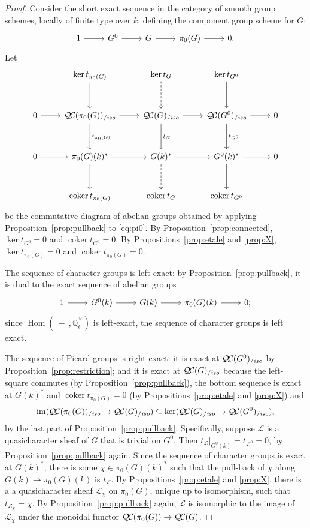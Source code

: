 \documentclass[11pt]{amsart}
\theoremstyle{plain}
\theoremstyle{definition}
\theoremstyle{remark}
\newcommand{\EE}{\mathbb{\bar Q}_\ell}
\newcommand{\Fq}{k}
\newcommand{\EEx}{\EE^\times}
\DeclareMathOperator{\Hom}{Hom}
\DeclareMathOperator{\coker}{coker}
\newcommand{\cs}[1]{{\mathcal{#1}}}
\newcommand{\QC}{{\mathcal{Q\hskip-0.8pt C}}}
\newcommand{\QCiso}[1]{\QC(#1)_{/\textit{iso}}}
\newcommand{\image}{{\operatorname{im}}}
\newcommand{\trFrob}[1]{t_{#1}}
\begin{document}
\begin{proof}
  Consider the short exact sequence in the category of smooth group
  schemes, locally of finite type over $\Fq$, defining the component
  group scheme for $G$:
  \begin{equation}\label{eq:pi0}
  \begin{tikzcd}
    1 \rar & G^0 \rar & G \rar & \pi_0(G) \rar & 0.
  \end{tikzcd}
  \end{equation}
  Let
  \[
  \begin{tikzcd}[row sep=30]
    {}& \ker t_{\pi_0(G)} \dar & \arrow[dashed]{d} \ker \trFrob{G} & \ker t_{G^0} \dar & \\
    0 \rar & \QCiso{\pi_0(G)} \rar \dar{t_{\pi_0(G)}}
    & \QCiso{G} \rar \dar{\trFrob{G}} & \QCiso{G^0} \rar \dar{t_{G^0}} & 0\\
    0 \rar & \pi_0(G)(\Fq)^* \rar \dar
    & \arrow[dashed]{d} G(\Fq)^* \rar & G^0(\Fq)^* \rar \dar & 0\\
    & \coker t_{\pi_0(G)} & \coker \trFrob{G} &  \coker t_{G^0} &
  \end{tikzcd}
  \]
  be the commutative diagram of abelian groups obtained by applying
  Proposition~\ref{prop:pullback} to \eqref{eq:pi0}.  By
  Proposition~\ref{prop:connected}, $\ker t_{G^0} =0$ and $\coker t_{G^0}=0$.
  By Propositions~\ref{prop:etale} and \ref{prop:X}, $\ker t_{\pi_0(G)}=0$
  and $\coker t_{\pi_0(G)}=0$.

  The sequence of character groups is left-exact: by
  Proposition~\ref{prop:pullback}, it is dual to the exact sequence of
  abelian groups
  \begin{equation}\label{eq:pi1}
  \begin{tikzcd}
    1 \rar & G^0(\Fq) \rar & G(\Fq) \rar & \pi_0(G)(\Fq) \rar & 0;
  \end{tikzcd}
  \end{equation}
  since $\Hom(\ - \ ,\EEx)$ is left-exact, the sequence of
  character groups is left exact.

  The sequence of Picard groups is right-exact: it is exact at
  $\QCiso{G^0}$ by Proposition~\ref{prop:restriction}; and
  it is exact at $\QCiso{G}$ because the left-square
  commutes (by Proposition~\ref{prop:pullback}), the bottom sequence
  is exact at $G(\Fq)^*$ and $\coker t_{\pi_0(G)} =0$
  (by Propositions~\ref{prop:etale} and \ref{prop:X}) and
  \[
  \image(\QCiso{\pi_0(G)} \to \QCiso{G}) \subseteq \ker(\QCiso{G} \to \QCiso{G^0}),
  \]
  by the last part of Proposition~\ref{prop:pullback}. Specifically,
  suppose $\cs{L}$ is a quasicharacter sheaf of $G$ that is trivial on
  $G^0$. Then $\trFrob{\cs{L}}\vert_{G^0(\Fq)} = \trFrob{\cs{L}^0} =0$,
  by Proposition~\ref{prop:pullback} again. Since the sequence of
  character groups is exact at $G(\Fq)^*$, there is
  some $\chi \in \pi_0(G)(\Fq)^*$ such that the
  pull-back of $\chi$ along $G(\Fq)\to \pi_0(G)(\Fq)$ is
  $\trFrob{\cs{L}}$. By Propositions~\ref{prop:etale} and \ref{prop:X},
  there is a a quasicharacter sheaf $\cs{L}_\chi$ on $\pi_0(G)$, unique up
  to isomorphism, such that $\trFrob{\cs{L}_\chi} = \chi$. By
  Proposition~\ref{prop:pullback} again, $\cs{L}$ is isomorphic to the
  image of $\cs{L}_\chi$ under the monoidal functor $\QC(\pi_0(G)) \to \QC(G)$.


\end{proof}
\end{document}
